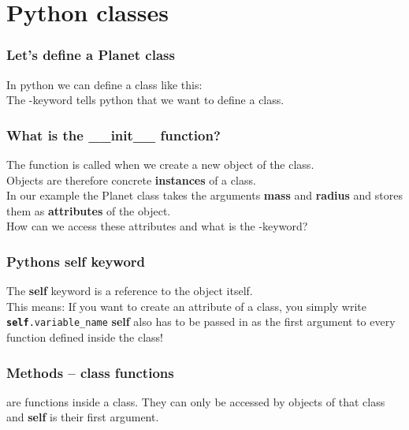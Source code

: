 \documentclass{beamer}
\begin{document}
\section{Python classes}
\begin{frame}
  \frametitle{Let's define a Planet class}
  In python we can define a class like this:\\
  
  \vspace{5mm}
  The \textbf{}-keyword tells python that we want to define a class.\\
\end{frame}
\begin{frame}
  \frametitle{What is the \_\_init\_\_ function?}
  The \textbf{} function is called when we create a new object of the class.\\
  \vspace{5mm}
  Objects are therefore concrete \textbf{instances} of a class.\\
  \vspace{5mm}
  In our example the Planet class takes the arguments \textbf{mass} and \textbf{radius} and stores them as \textbf{attributes} of the object.\\
  \vspace{5mm}
  How can we access these attributes and what is the \textbf{}-keyword?\\
\end{frame}
\begin{frame}
  \frametitle{Pythons self keyword}
  The \textbf{self} keyword is a reference to the object itself.\\
  
  This means: If you want to create an attribute of a class, you simply write \texttt{\textbf{self}.variable\_name}
  \vspace{5mm}
  \textbf{self} also has to be passed in as the first argument to every function defined inside the class! 
\end{frame}
\begin{frame}
  \frametitle{Methods -- class functions}
  \textbf{} are functions inside a class. They can only be accessed by objects of that class and \textbf{self} is their first argument.  
  
\end{frame}
\end{document}
